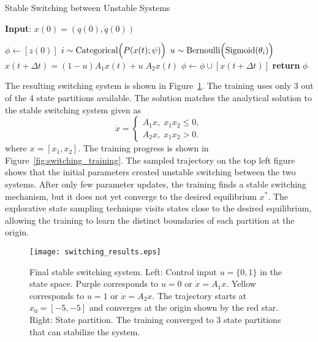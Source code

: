 \begin{algorithm}
      \caption{Stable Switching between Unstable Systems}
      \label{algo:switching_A1A2}
      \small
      \hspace*{\algorithmicindent} \textbf{Input}: $x(0) = (q(0), \dot{q}(0))$
      \begin{algorithmic}[1]
        \State $\phi \leftarrow  [z(0)]$ 
              \State $i \sim \text{Categorical}\Bigl(P(x(t); \psi)\Bigr)$ 
              \State $u \sim \text{Bernoulli} \Bigl(\textrm{Sigmoid}(\theta_i) \Bigr)$      
              \State $x(t+\Delta t) = (1-u)A_1x(t) + u \; A_2x(t) $
              \State $\phi \leftarrow \phi \cup [x(t+\Delta t)]$
            \EndFor
          \State \textbf{return} $\phi$
      \end{algorithmic}
  \end{algorithm}
  
%
The resulting switching system is shown in Figure~\ref{fig:final_switching}.
%
The training uses only 3 out of the 4 state partitions available.
%
The solution matches the analytical solution to the stable switching system given as~\cite{liberzon2003switching}
\begin{equation*}
    \dot{x} = \begin{cases}
        A_1x, \; x_1x_2 \leq 0, \\
        A_2x, \; x_1x_2 > 0.
    \end{cases}
\end{equation*}
\noindent where $x=[x_1, x_2]$.
%
The training progress is shown in Figure~\ref{fig:switching_training}.
%
The sampled trajectory on the top left figure shows that the initial parameters
created unstable switching between the two systems.
%
After only few parameter updates, the training finds a stable switching
mechanism, but it does not yet converge to the desired equilibrium $x^*$.
%
The explorative state sampling technique visits states close to the desired
equilibrium, allowing the training to learn the distinct boundaries of each
partition at the origin. 
\begin{figure}[H]
    \centering
    \texttt{[image: switching\_results.eps]}
    \caption{Final stable switching system. Left: Control input $u=\{0, 1\}$ in
    the state space. Purple corresponds to $u=0$ or $\dot{x} = A_1x$. Yellow
    corresponds to $u=1$ or $\dot{x} = A_2x$. The trajectory starts at $x_0=[-5,
    -5]$ and converges at the origin shown by the red star. Right: State
    partition. The training converged to 3 state partitions that can stabilize
    the system.}
    \label{fig:final_switching}
\end{figure}


